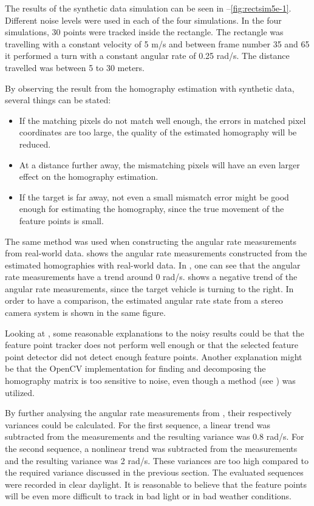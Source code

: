 The results of the synthetic data simulation can be seen in --\ref{fig:rectsim5e-1}.
Different noise levels were used in each of the four simulations.
In the four simulations, 30 points were tracked inside the rectangle.
The rectangle was travelling with a constant velocity of 5 m/s and between frame number 35 and 65 it performed a turn with a constant angular rate of 0.25 rad/s.
The distance travelled was between 5 to 30 meters.

By observing the result from the homography estimation with synthetic data, several things can be stated:
\begin{itemize}
	\item If the matching pixels do not match well enough, \ie the errors in matched pixel coordinates are too large, the quality of the estimated homography will be reduced.
	\item At a distance further away, the mismatching pixels will have an even larger effect on the homography estimation.
	\item If the target is far away, not even a small mismatch error might be good enough for estimating the homography, since the true movement of the feature points is small.
\end{itemize}

The same method was used when constructing the angular rate measurements from real-world data.
 shows the angular rate measurements constructed from the estimated homographies with real-world data.
In , one can see that the angular rate measurements have a trend around 0 rad/s.
 shows a negative trend of the angular rate measurements, since the target vehicle is turning to the right.
In order to have a comparison, the estimated angular rate state from a stereo camera system is shown in the same figure.

Looking at , some reasonable explanations to the noisy results could be that the feature point tracker does not perform well enough or that the selected feature point detector did not detect enough feature points.
Another explanation might be that the OpenCV implementation for finding and decomposing the homography matrix is too sensitive to noise, even though a \abbrRANSAC method (see ) was utilized.

By further analysing the angular rate measurements from , their respectively variances could be calculated.
For the first sequence, a linear trend was subtracted from the measurements and the resulting variance was 0.8 rad/s.
For the second sequence, a nonlinear trend was subtracted from the measurements and the resulting variance was 2 rad/s.
These variances are too high compared to the required variance discussed in the previous section.
The evaluated sequences were recorded in clear daylight.
It is reasonable to believe that the feature points will be even more difficult to track in bad light or in bad weather conditions.

